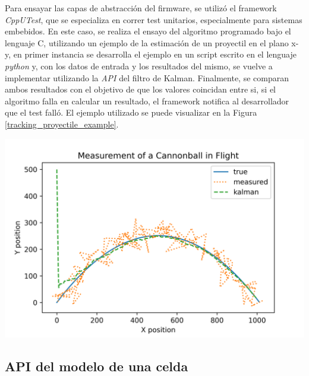 \documentclass[10pt, a4paper]{report}
\begin{document}
\begin{minipage}{0.5\textwidth}
Para ensayar las capas de abstracci\'on del firmware, se utiliz\'o el
framework \emph{CppUTest}, que se especializa en correr test unitarios,
especialmente para sistemas embebidos. En este caso, se realiza el ensayo del
algoritmo programado bajo el lenguaje C, utilizando un ejemplo de la
estimaci\'on de un proyectil en el plano x-y, en primer instancia se desarrolla
el ejemplo en un script escrito en el lenguaje \emph{python} y, con los
datos de entrada y los resultados del mismo, se vuelve a implementar utilizando
la \emph{API} del filtro de Kalman. Finalmente, se comparan ambos resultados con
el objetivo de que los valores coincidan entre si, si el algoritmo falla en
calcular un resultado, el framework notifica al desarrollador que el test
fall\'o. El ejemplo utilizado se puede visualizar en la Figura
\ref{tracking_proyectile_example}.
\end{minipage}
\begin{minipage}{0.5\textwidth}
    \begin{center}
        \includegraphics[width=1\textwidth]{tracking_proyectile_example.png}
        \label{tracking_proyectile_example}
    \end{center}
\end{minipage}

\subsection{\acrshort{API} del modelo de una celda}
\end{document}
